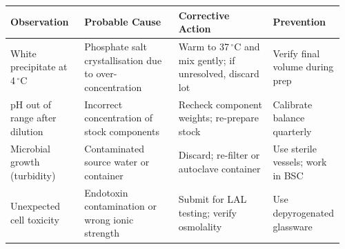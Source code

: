 \documentclass[10pt,a4paper]{article}
\begin{document}
\begin{tcolorbox}[
  enhanced, arc=4pt, boxrule=0.6pt,
  colback=NexaLight, colframe=NexaBlue,
  title={\faWrench\enskip Troubleshooting Guide},
  fonttitle=\bfseries\color{white}, coltitle=white,
  attach boxed title to top left={yshift=-2mm,xshift=4mm},
  boxed title style={enhanced, arc=3pt, colback=NexaBlue, colframe=NexaBlue, boxrule=0pt},
  top=6mm, bottom=3mm, left=2mm, right=2mm,
]

\renewcommand{\arraystretch}{1.4}
\small
\begin{tabularx}{\linewidth}{@{}
    L{0.22\linewidth}
    L{0.28\linewidth}
    L{0.28\linewidth}
    L{0.18\linewidth}
  @{}}
  \color{white}\bfseries Observation &
  \color{white}\bfseries Probable Cause &
  \color{white}\bfseries Corrective Action &
  \color{white}\bfseries Prevention \\
  \midrule
  White precipitate at 4\,$^{\circ}$C &
    Phosphate salt crystallisation due to over-concentration &
    Warm to 37\,$^{\circ}$C and mix gently; if unresolved, discard lot &
    Verify final volume during prep \\
  pH out of range after dilution &
    Incorrect concentration of stock components &
    Recheck component weights; re-prepare stock &
    Calibrate balance quarterly \\
  Microbial growth (turbidity) &
    Contaminated source water or container &
    Discard; re-filter or autoclave container &
    Use sterile vessels; work in BSC \\
  Unexpected cell toxicity &
    Endotoxin contamination or wrong ionic strength &
    Submit for LAL testing; verify osmolality &
    Use depyrogenated glassware \\
\end{tabularx}

\end{tcolorbox}

\vspace{5mm}
\end{document}
